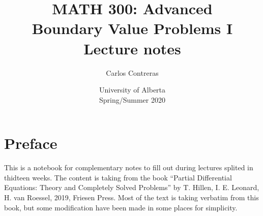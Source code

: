 \documentclass[12pt,oneside]{book}
\title{{\bf MATH 300: Advanced \\ Boundary Value Problems I} \\
Lecture notes}
\author{Carlos Contreras}
\date{University of Alberta \\ Spring/Summer 2020}
\begin{document}
\thispagestyle{empty}

\frontmatter

\maketitle

\tableofcontents


\chapter{Preface}
This is a notebook for complementary notes to  fill out during lectures splited in thidteen weeks. The content is taking from the book ``Partial Differential Equations:
Theory and Completely Solved
Problems'' by T. Hillen, I. E. Leonard, H. van Roessel, 2019, Friesen Press. Most of the text is taking verbatim from this book, but some modification have been made in some places for simplicity. 


\mainmatter















\end{document}
